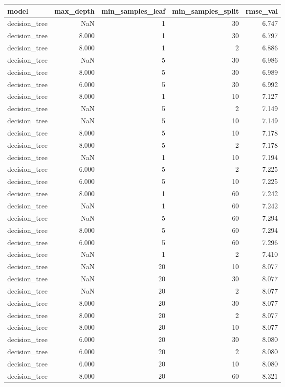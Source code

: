 \begin{tabular}{lrrrr}
\toprule
model & max_depth & min_samples_leaf & min_samples_split & rmse_val \\
\midrule
decision_tree & NaN & 1 & 30 & 6.747 \\
decision_tree & 8.000 & 1 & 30 & 6.797 \\
decision_tree & 8.000 & 1 & 2 & 6.886 \\
decision_tree & NaN & 5 & 30 & 6.986 \\
decision_tree & 8.000 & 5 & 30 & 6.989 \\
decision_tree & 6.000 & 5 & 30 & 6.992 \\
decision_tree & 8.000 & 1 & 10 & 7.127 \\
decision_tree & NaN & 5 & 2 & 7.149 \\
decision_tree & NaN & 5 & 10 & 7.149 \\
decision_tree & 8.000 & 5 & 10 & 7.178 \\
decision_tree & 8.000 & 5 & 2 & 7.178 \\
decision_tree & NaN & 1 & 10 & 7.194 \\
decision_tree & 6.000 & 5 & 2 & 7.225 \\
decision_tree & 6.000 & 5 & 10 & 7.225 \\
decision_tree & 8.000 & 1 & 60 & 7.242 \\
decision_tree & NaN & 1 & 60 & 7.242 \\
decision_tree & NaN & 5 & 60 & 7.294 \\
decision_tree & 8.000 & 5 & 60 & 7.294 \\
decision_tree & 6.000 & 5 & 60 & 7.296 \\
decision_tree & NaN & 1 & 2 & 7.410 \\
decision_tree & NaN & 20 & 10 & 8.077 \\
decision_tree & NaN & 20 & 30 & 8.077 \\
decision_tree & NaN & 20 & 2 & 8.077 \\
decision_tree & 8.000 & 20 & 30 & 8.077 \\
decision_tree & 8.000 & 20 & 2 & 8.077 \\
decision_tree & 8.000 & 20 & 10 & 8.077 \\
decision_tree & 6.000 & 20 & 30 & 8.080 \\
decision_tree & 6.000 & 20 & 2 & 8.080 \\
decision_tree & 6.000 & 20 & 10 & 8.080 \\
decision_tree & 8.000 & 20 & 60 & 8.321 \\

\end{tabular}

